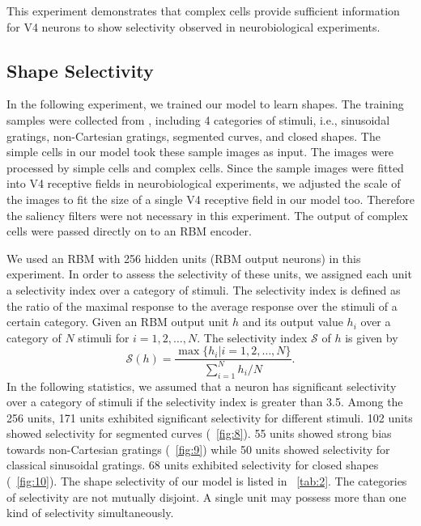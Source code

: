 \documentclass[conference]{IEEEtran}
\begin{document}
This experiment demonstrates that complex cells provide sufficient information
for V4 neurons to show selectivity observed in neurobiological experiments.

\subsection{Shape Selectivity}

In the following experiment, we trained our model to learn shapes.
The training samples were collected from \cite{gallant1996,pasupathy1999,pasupathy2001}, 
including 4 categories of stimuli, i.e.,
sinusoidal gratings, non-Cartesian gratings, segmented curves, and closed shapes.
The simple cells in our model took these sample images as input.
The images were processed by simple cells and complex cells.
Since the sample images were fitted into V4 receptive fields in neurobiological experiments,
we adjusted the scale of the images to fit the size of a single V4 receptive field in our model too.
Therefore the saliency filters were not necessary in this experiment.
The output of complex cells were passed directly on to an RBM encoder.

We used an RBM with 256 hidden units (RBM output neurons) in this experiment.
In order to assess the selectivity of these units,
we assigned each unit a selectivity index over a category of stimuli.
The selectivity index is defined as the ratio of the maximal response to the average response 
over the stimuli of a certain category.
Given an RBM output unit $h$ and its output value $h_i$ over a category of $N$ stimuli for $i=1,2,\dots,N$.
The selectivity index $\mathcal{S}$ of $h$ is given by
\begin{equation}
\mathcal{S}(h)=\frac{\max\{h_i|i=1,2,\dots,N\}}{\sum_{i=1}^N h_i/N}.
\end{equation}
In the following statistics, we assumed that a neuron has significant selectivity over a category of stimuli
if the selectivity index is greater than 3.5.
Among the 256 units, 171 units exhibited significant selectivity for different stimuli.
102 units showed selectivity for segmented curves (\figurename~\ref{fig:8}).
55 units showed strong bias towards non-Cartesian gratings (\figurename~\ref{fig:9})
while 50 units showed selectivity for classical sinusoidal gratings.
68 units exhibited selectivity for closed shapes (\figurename~\ref{fig:10}).
The shape selectivity of our model is listed in \tablename~\ref{tab:2}.
The categories of selectivity are not mutually disjoint.
A single unit may possess more than one kind of selectivity simultaneously.
\end{document}
